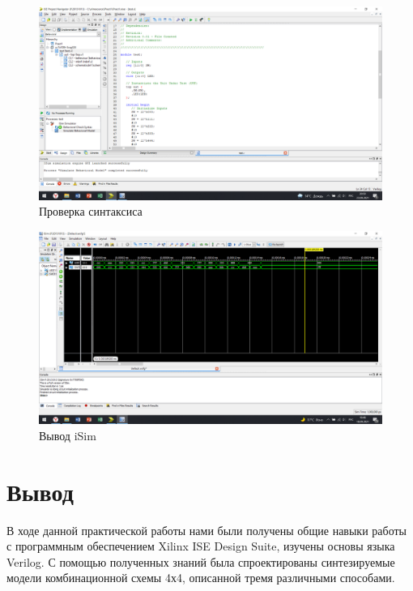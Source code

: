 \documentclass[a4paper,14pt]{extarticle}
\begin{document}
\begin{figure}[htpb]
	\centering
	\includegraphics[width=\linewidth]{images/test-result}
	\caption{Проверка синтаксиса}
	\label{fig:test-result}
\end{figure}
\begin{figure}[htpb]
	\centering
	\includegraphics[width=\linewidth]{images/isim}
	\caption{Вывод iSim }
	\label{fig:isim}
\end{figure}

\newpage
\section{Вывод}
В ходе данной практической работы нами были получены общие навыки работы с программным обеспечением Xilinx ISE Design Suite, изучены основы языка Verilog. С помощью полученных знаний была спроектированы синтезируемые модели комбинационной схемы 4х4, описанной тремя различными способами.
\end{document}
